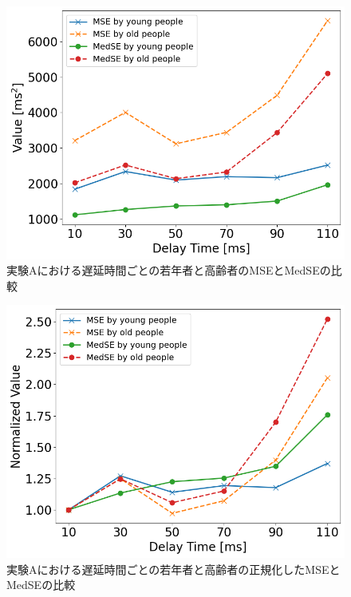 \begin{figure}[tbp]
  \centering
  \includegraphics[scale=0.5]{figures/Honbann/Comparison_young_old/110ms_MSE_MedSE.png}
  \caption{実験Aにおける遅延時間ごとの若年者と高齢者のMSEとMedSEの比較}
  \label{fig:110ms_MSE_MedSE}
\end{figure}
\begin{figure}[tbp]
  \centering
  \includegraphics[scale=0.5]{figures/Honbann/Comparison_young_old/Normalized110ms_MSE_MedSE.png}
  \caption{実験Aにおける遅延時間ごとの若年者と高齢者の正規化したMSEとMedSEの比較}
  \label{fig:Normalized_110ms_MSE_MedSE}
\end{figure}
